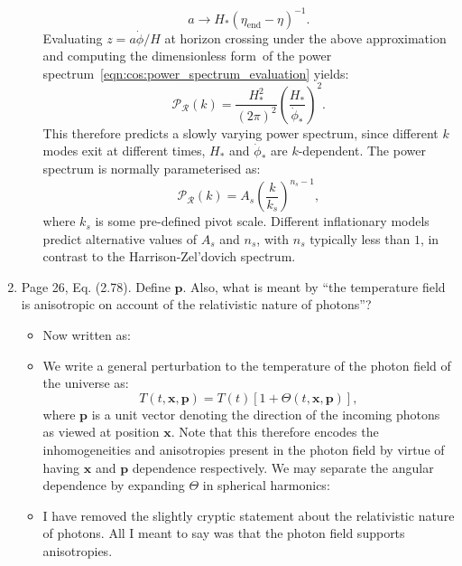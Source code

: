 \documentclass[11pt]{article}
\begin{document}
\begin{enumerate}
\begin{itemize}
\begin{equation}
  a \rightarrow H_*{(\eta_\mathrm{end}-\eta)}^{-1}.
  \tag{2.75}
\end{equation}
Evaluating \(z = a \dot{\phi} / H\) at horizon crossing under the above approximation and computing the dimensionless form~of the power spectrum~\eqref{eqn:cos:power_spectrum_evaluation} yields:
\begin{equation}
    \mathcal{P}_\mathcal{R}(k) = \frac{H_*^2}{{(2\pi)}^2}{\left( \frac{H_*}{\dot{\phi}_*} \right)}^2.
  \label{eqn:cos:inflation_power}
  \tag{2.76}
\end{equation}
This therefore predicts a slowly varying power spectrum, since different \(k\) modes exit at different times, \(H_*\) and \(\dot{\phi}_*\) are \(k\)-dependent. The power spectrum is normally parameterised as:
\begin{equation}
    \mathcal{P}_\mathcal{R}(k) = A_s {\left( \frac{k}{k_s} \right)}^{n_s-1},
  \label{eqn:cos:lcdm_power}
  \tag{2.77}
\end{equation}
where \(k_s\) is some pre-defined pivot scale.
Different inflationary models predict alternative values of \(A_s\) and \(n_s\), with \(n_s\) typically less than \(1\), in contrast to the Harrison-Zel'dovich spectrum.
  \end{itemize}
\item Page 26, Eq. (2.78). Define $\mathbf{p}$. Also, what is meant by
  ``the temperature field is anisotropic on account of the
  relativistic nature of photons''?
\begin{itemize}
    \item Now written as:
    \item We write a general perturbation to the temperature of the photon field of the universe as:
        \begin{equation}
            T(t,\mathbf{x},\mathbf{p}) = T(t)\left[ 1+\Theta(t,\mathbf{x},\mathbf{p}) \right],
        \end{equation}
        where \(\mathbf{p}\) is a unit vector denoting the direction of the incoming photons as viewed at position \(\mathbf{x}\). Note that this therefore encodes the inhomogeneities and anisotropies present in the photon field by virtue of having \(\mathbf{x}\) and \(\mathbf{p}\) dependence respectively. We may separate the angular dependence by expanding \(\Theta\) in spherical harmonics:
  \item I have removed the slightly cryptic statement about the relativistic nature of photons. All I meant to say was that the photon field supports anisotropies.
\end{itemize}

\end{enumerate}
\end{document}

